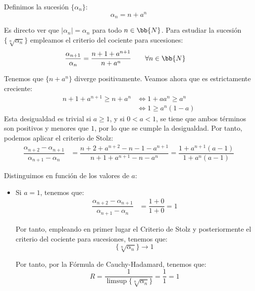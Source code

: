 \begin{ejercicio}
\begin{enumerate}
        Definimos la sucesión $\{\alpha_n\}$:
        \[
            \alpha_n = n+a^n
        \]

        Es directo ver que $|\alpha_n|=\alpha_n$ para todo $n\in \bb{N}$. Para estudiar la sucesión $\{\sqrt[n]{\alpha_n}\}$ empleamos el criterio del cociente para sucesiones:
        \begin{align*}
            \dfrac{\alpha_{n+1}}{\alpha_n} &= \dfrac{n+1+a^{n+1}}{n+a^n}\qquad \forall n\in \bb{N}
        \end{align*}

        Tenemos que $\{n+a^n\}$ diverge positivamente. Veamos ahora que es estrictamente creciente:
        \begin{align*}
            n+1+a^{n+1}\geq n+a^n &\iff 1+aa^n\geq a^n\\
            &\iff 1\geq a^n(1-a)
        \end{align*}
        Esta desigualdad es trivial si $a\geq 1$, y si $0<a<1$, se tiene que ambos términos son positivos y menores que $1$, por lo que se cumple la desigualdad. Por tanto, podemos aplicar el criterio de Stolz:
        \begin{align*}
            \dfrac{\alpha_{n+2}-\alpha_{n+1}}{\alpha_{n+1}-\alpha_n} &= \dfrac{n+2+a^{n+2}-n-1-a^{n+1}}{n+1+a^{n+1}-n-a^n}
            = \dfrac{1+a^{n+1}\left(a-1\right)}{1+a^n\left(a-1\right)}
        \end{align*}

        Distinguimos en función de los valores de $a$:
        \begin{itemize}
            \item Si $a=1$, tenemos que:
            \begin{align*}
                \dfrac{\alpha_{n+2}-\alpha_{n+1}}{\alpha_{n+1}-\alpha_n} &= \dfrac{1+0}{1+0} = 1
            \end{align*}

            Por tanto, empleando en primer lugar el Criterio de Stolz y posteriormente el criterio del cociente para sucesiones, tenemos que:
            \begin{equation*}
                \{\sqrt[n]{\alpha_n}\}\to 1
            \end{equation*}

            Por tanto, por la Fórmula de Cauchy-Hadamard, tenemos que:
            \begin{equation*}
                R = \dfrac{1}{\limsup\{\sqrt[n]{\alpha_n}\}} = \dfrac{1}{1} = 1
            \end{equation*}


\end{itemize}
\end{enumerate}
\end{ejercicio}

